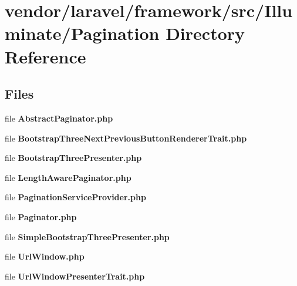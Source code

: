 \section{vendor/laravel/framework/src/\+Illuminate/\+Pagination Directory Reference}
\label{dir_51613546073ddab33dc542833180a460}
\subsection*{Files}
\begin{DoxyCompactItemize}
\item 
file {\bf Abstract\+Paginator.\+php}
\item 
file {\bf Bootstrap\+Three\+Next\+Previous\+Button\+Renderer\+Trait.\+php}
\item 
file {\bf Bootstrap\+Three\+Presenter.\+php}
\item 
file {\bf Length\+Aware\+Paginator.\+php}
\item 
file {\bf Pagination\+Service\+Provider.\+php}
\item 
file {\bf Paginator.\+php}
\item 
file {\bf Simple\+Bootstrap\+Three\+Presenter.\+php}
\item 
file {\bf Url\+Window.\+php}
\item 
file {\bf Url\+Window\+Presenter\+Trait.\+php}
\end{DoxyCompactItemize}
